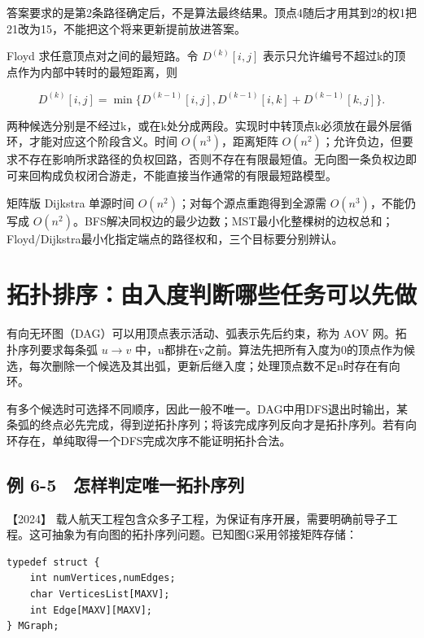 答案要求的是第2条路径确定后，不是算法最终结果。顶点4随后才用其到2的权1把21改为15，不能把这个将来更新提前放进答案。

Floyd 求任意顶点对之间的最短路。令 \(D^{(k)}[i,j]\) 表示只允许编号不超过k的顶点作为内部中转时的最短距离，则

\[D^{(k)}[i,j]=\min\{D^{(k-1)}[i,j],D^{(k-1)}[i,k]+D^{(k-1)}[k,j]\}.\]

两种候选分别是不经过k，或在k处分成两段。实现时中转顶点k必须放在最外层循环，才能对应这个阶段含义。时间 \(O(n^3)\)，距离矩阵 \(O(n^2)\)；允许负边，但要求不存在影响所求路径的负权回路，否则不存在有限最短值。无向图一条负权边即可来回构成负权闭合游走，不能直接当作通常的有限最短路模型。

矩阵版 Dijkstra 单源时间 \(O(n^2)\)；对每个源点重跑得到全源需 \(O(n^3)\)，不能仍写成 \(O(n^2)\)。BFS解决同权边的最少边数；MST最小化整棵树的边权总和；Floyd/Dijkstra最小化指定端点的路径权和，三个目标要分别辨认。

\section{拓扑排序：由入度判断哪些任务可以先做}\label{ds-06-08}

有向无环图（DAG）可以用顶点表示活动、弧表示先后约束，称为 AOV 网。拓扑序列要求每条弧 \(u\to v\) 中，u都排在v之前。算法先把所有入度为0的顶点作为候选，每次删除一个候选及其出弧，更新后继入度；处理顶点数不足n时存在有向环。

有多个候选时可选择不同顺序，因此一般不唯一。DAG中用DFS退出时输出，某条弧的终点必先完成，得到逆拓扑序列；将该完成序列反向才是拓扑序列。若有向环存在，单纯取得一个DFS完成次序不能证明拓扑合法。

\subsection{例 6-5　怎样判定唯一拓扑序列}\label{ds-ex6-5}

\noindent{}【2024】 载人航天工程包含众多子工程，为保证有序开展，需要明确前导子工程。这可抽象为有向图的拓扑序列问题。已知图G采用邻接矩阵存储：

\par\medskip\noindent
\begin{minipage}{\linewidth}
\begin{verbatim}
typedef struct {
    int numVertices,numEdges;
    char VerticesList[MAXV];
    int Edge[MAXV][MAXV];
} MGraph;
\end{verbatim}
\end{minipage}\par\medskip

